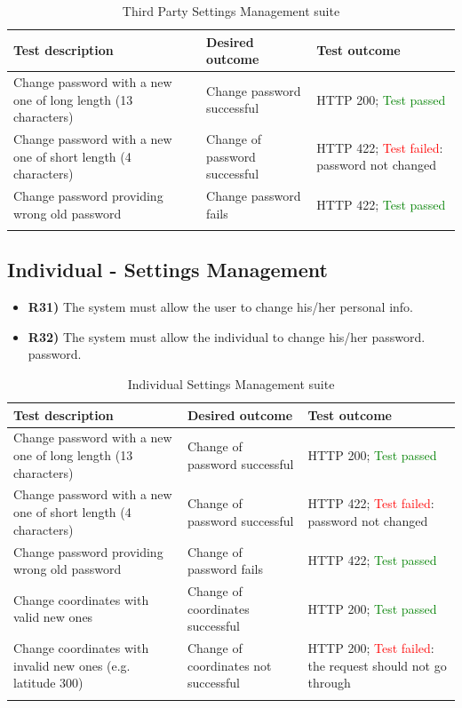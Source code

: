 \documentclass[titlepage]{article}
\begin{document}
\begin{longtable}{| p{3 cm} | p{4 cm} | p{4 cm} |} \hline
    {\bf Test description} & {\bf Desired outcome} & {\bf Test outcome} \\ \hline
    Change password with a new one of long length (13 characters) & 
    Change password successful
        & HTTP 200; \textcolor{green}{Test passed} \\ \hline
    Change password with a new one of short length (4 characters) & 
    Change of password successful
        & HTTP 422; \textcolor{red}{Test failed}: password not changed \\ \hline
    Change password providing wrong old password & 
    Change password fails
        & HTTP 422; \textcolor{green}{Test passed} \\ \hline
    \caption{Third Party Settings Management suite}
\end{longtable}


\subsection{Individual - Settings Management}
\begin{itemize}
    \item {\bf R31)} The system must allow the user to change his/her personal info.
    \item {\bf R32)} The system must allow the individual to change his/her password.
 password.
\end{itemize}

\begin{longtable}{| p{3 cm} | p{4 cm} | p{4 cm} |} \hline
    {\bf Test description} & {\bf Desired outcome} & {\bf Test outcome} \\ \hline
    Change password with a new one of long length (13 characters) & 
    Change of password successful
        & HTTP 200; \textcolor{green}{Test passed} \\ \hline
    Change password with a new one of short length (4 characters) & 
    Change of password successful
        & HTTP 422; \textcolor{red}{Test failed}: password not changed \\ \hline
    Change password providing wrong old password & 
    Change of password fails
        & HTTP 422; \textcolor{green}{Test passed} \\ \hline
    Change coordinates with valid new ones & 
    Change of coordinates successful
        & HTTP 200; \textcolor{green}{Test passed} \\ \hline
    Change coordinates with invalid new ones (e.g. latitude 300)& 
    Change of coordinates not successful
        & HTTP 200; \textcolor{red}{Test failed}: the request should not go through \\ \hline
    \caption{Individual Settings Management suite}
\end{longtable}
\end{document}
